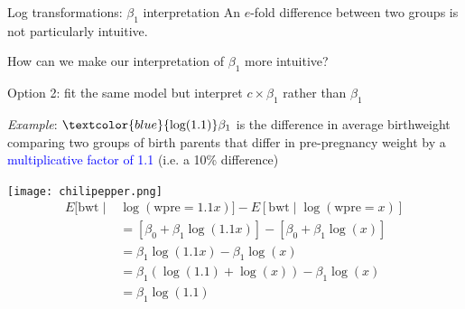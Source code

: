 \documentclass[10pt,t]{beamer}
\begin{document}
\begin{frame}{Log transformations: $\beta_1$ interpretation}
An $e$-fold difference between two groups is not particularly intuitive.

How can we make our interpretation of $\beta_1$ more intuitive?

\vspace{0.3cm}

Option 2: fit the same model but interpret $c \times \beta_1$ rather than $\beta_1$\pause

\vspace{0.3cm}

\textit{Example}: $\textcolor{blue}{\text{log}(1.1)}\beta_1$ is the difference in average birthweight comparing two groups of birth parents that differ in pre-pregnancy weight by a \textcolor{blue}{multiplicative factor of 1.1} (i.e. a 10\% difference)\pause

\texttt{[image: chilipepper.png]}
\begin{align*}
E[\text{bwt} \mid & \log(\text{wpre} = 1.1x)] - E[\text{bwt} \mid \log(\text{wpre} = x)] \\
& = [\beta_0 + \beta_1 \log(1.1x)] - [\beta_0 + \beta_1 \log(x)] \\
& = \beta_1 \log(1.1x) - \beta_1 \log(x) \\
& = \beta_1 (\log(1.1) + \log(x)) - \beta_1 \log(x) \\
& = \beta_1 \log(1.1)
\end{align*}

\end{frame}
\end{document}

